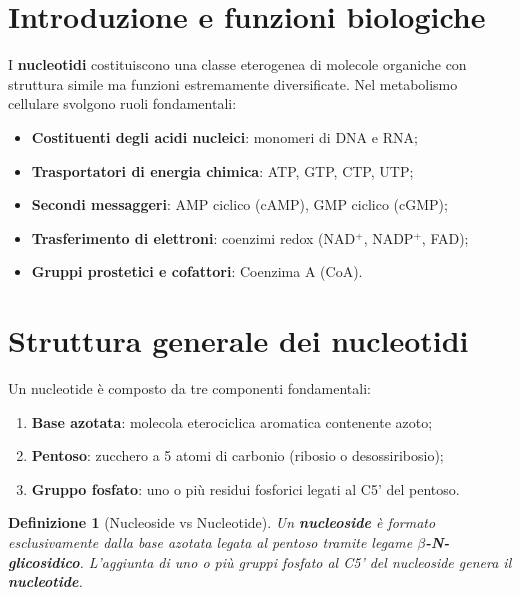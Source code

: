 \documentclass[12pt,a4paper]{report}
\newtheorem{definizione}{Definizione}[section]
\begin{document}
\section{Introduzione e funzioni biologiche}
I \textbf{nucleotidi} costituiscono una classe eterogenea di molecole organiche con struttura simile ma funzioni estremamente diversificate. Nel metabolismo cellulare svolgono ruoli fondamentali:
\begin{itemize}
\item \textbf{Costituenti degli acidi nucleici}: monomeri di DNA e RNA;
\item \textbf{Trasportatori di energia chimica}: ATP, GTP, CTP, UTP;
\item \textbf{Secondi messaggeri}: AMP ciclico (cAMP), GMP ciclico (cGMP);
\item \textbf{Trasferimento di elettroni}: coenzimi redox (NAD$^+$, NADP$^+$, FAD);
\item \textbf{Gruppi prostetici e cofattori}: Coenzima A (CoA).
\end{itemize}

\section{Struttura generale dei nucleotidi}
Un nucleotide è composto da tre componenti fondamentali:
\begin{enumerate}
\item \textbf{Base azotata}: molecola eterociclica aromatica contenente azoto;
\item \textbf{Pentoso}: zucchero a 5 atomi di carbonio (ribosio o desossiribosio);
\item \textbf{Gruppo fosfato}: uno o più residui fosforici legati al C5' del pentoso.
\end{enumerate}
\begin{definizione}[Nucleoside vs Nucleotide]
Un \textbf{nucleoside} è formato esclusivamente dalla base azotata legata al pentoso tramite legame \textbf{$\beta$-N-glicosidico}. L'aggiunta di uno o più gruppi fosfato al C5' del nucleoside genera il \textbf{nucleotide}.
\end{definizione}
\end{document}

